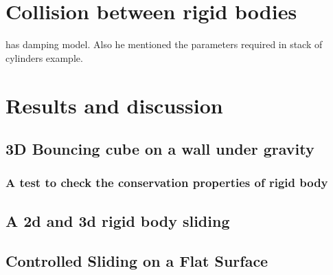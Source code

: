\documentclass[preprint,12pt]{elsarticle}
\newcommand{\todoin}{\todo[inline]}
\begin{document}
\section{Collision between rigid bodies}
\label{sec:contact-force}

\citet{chen2019coupled} has damping model. Also he mentioned the parameters
required in stack of cylinders example.





\section{Results and discussion}
\label{sec:results}

\subsection{3D Bouncing cube on a wall under gravity}
\label{sec:bouncing-cube}

\subsubsection{A test to check the conservation properties of rigid body}
\label{sec:conservation-of-rb-properties}



\subsection{A 2d and 3d rigid body sliding}
\label{sec:rigid-body-sliding}


\subsection{Controlled Sliding on a Flat Surface}
\label{sec:controlled-rigid-body-sliding}
\end{document}
